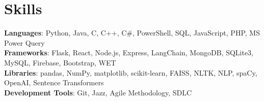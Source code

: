 \documentclass[letterpaper,11pt]{article}
\begin{document}
\section{\textbf{\Large Skills}}
 \begin{itemize}[leftmargin=0.15in, label={}]
    \small{\item{
     \textbf{Languages}{: Python, Java, C, C++, C\#, PowerShell, SQL, JavaScript, PHP, MS Power Query} \\
     \textbf{Frameworks}{: Flask, React, Node.js, Express, LangChain, MongoDB, SQLite3, MySQL, Firebase, Bootstrap, WET} \\
     \textbf{Libraries}{: pandas, NumPy, matplotlib, scikit-learn, FAISS, NLTK, NLP, spaCy, OpenAI, Sentence Transformers} \\
     \textbf{Development Tools}{: Git, Jazz, Agile Methodology, SDLC} \\
    }}
 \end{itemize}


\end{document}
